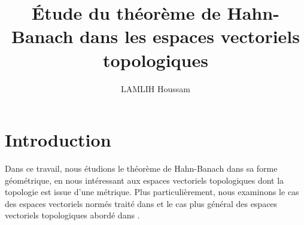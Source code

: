 \documentclass{article}
\title{Étude du théorème de Hahn-Banach dans les espaces vectoriels topologiques}
\author{LAMLIH Houssam}
\date{}
\begin{document}
\maketitle

\section{Introduction}

Dans ce travail, nous étudions le théorème de Hahn-Banach dans sa forme 
géométrique, en nous intéressant aux espaces vectoriels topologiques dont 
la topologie est issue d'une métrique. Plus particulièrement, nous examinons
le cas des espaces vectoriels normés traité dans \cite{brezis1983analyse} 
et le cas plus général des espaces vectoriels topologiques abordé dans 
\cite{schwartz1970topologie}. 
\end{document}
